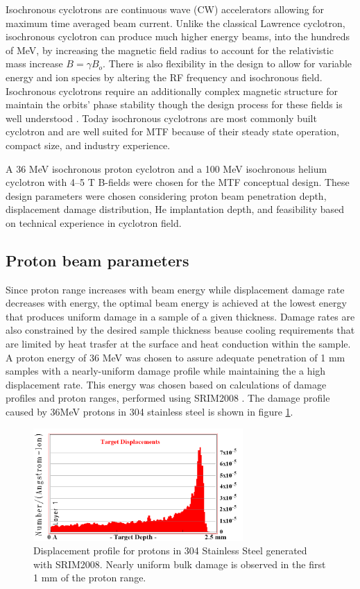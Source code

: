 \documentclass[final,3p,times,twocolumn]{elsarticle} %
\begin{document}
Isochronous cyclotrons are continuous wave (CW) accelerators allowing for maximum time averaged beam current.  Unlike the classical Lawrence cyclotron, isochronous cyclotron can produce much higher energy beams, into the hundreds of MeV, by increasing the magnetic field radius to account for the relativistic mass increase $B=\gamma B_o$.  There is also flexibility in the design to allow for variable energy and ion species by altering the RF frequency and isochronous field.  Isochronous cyclotrons require an additionally complex magnetic structure for maintain the orbits' phase stability though the design process for these fields is well understood \cite{strijckmans2001isochronous}. Today isochronous cyclotrons are most commonly built cyclotron and are well suited for MTF because of their steady state operation, compact size, and industry experience.

A 36 MeV isochronous proton cyclotron and a 100 MeV isochronous helium cyclotron with 4--5 T B-fields were chosen for the MTF conceptual design.  These design parameters were chosen considering proton beam penetration depth, displacement damage distribution, He implantation depth, and feasibility based on technical experience in cyclotron field. 

\subsection{Proton beam parameters}
Since proton range increases with beam energy while displacement damage rate decreases with energy, the optimal beam energy is achieved at the lowest energy that produces uniform damage in a sample of a given thickness.  Damage rates are also constrained by the desired sample thickness beause cooling requirements that are limited by heat trasfer at the surface and heat conduction within the sample. A proton energy of 36 MeV was chosen to assure adequate penetration of 1 mm samples with a nearly-uniform damage profile while maintaining the a high displacement rate.  This energy was chosen based on calculations of damage profiles and proton ranges, performed using SRIM2008 \cite{SRIM}.  The damage profile caused by 36MeV protons in 304 stainless steel is shown in figure \ref{fig:FeRange}.

\begin{figure}[htbp]
\begin{center}
\includegraphics[width=80mm]{Figures/FeRange.png}
\caption{Displacement profile for protons in 304 Stainless Steel generated with SRIM2008.  Nearly uniform bulk damage is observed in the first 1 mm of the proton range.}
\label{fig:FeRange}
\end{center}
\end{figure}
\end{document}
